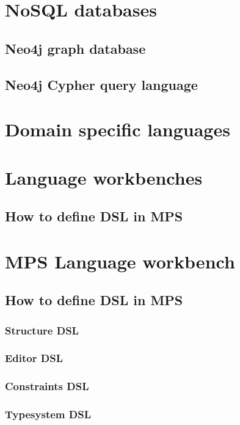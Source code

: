 \chapter{NoSQL databases}

\section{Neo4j graph database}

\section{Neo4j Cypher query language}

\chapter{Domain specific languages}



\chapter{Language workbenches}

\section{How to define DSL in MPS}



\chapter{MPS Language workbench}

\section{How to define DSL in MPS}

	\subsection{Structure DSL}
	\subsection{Editor DSL}
	\subsection{Constraints DSL}
	\subsection{Typesystem DSL}


